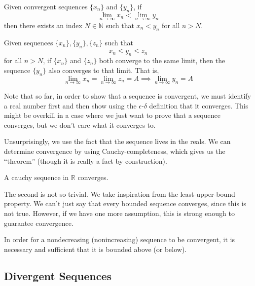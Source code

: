 \documentclass{article}
\begin{document}
    \begin{theorem}
      Given convergent sequences $\{x_n\}$ and $\{y_n\}$, if 
      \[ \lim_{n \rightarrow \infty} x_n < \lim_{n \rightarrow \infty} y_n\]
      then there exists an index $N \in \mathbb{N}$ such that $x_n < y_n$ for all $n > N$. 
    \end{theorem}

    \begin{theorem}
      Given sequences $\{x_n\}, \{y_n\}, \{z_n\}$ such that 
      \[x_n \leq y_n \leq z_n\]
      for all $n > N$, if $\{x_n\}$ and $\{z_n\}$ both converge to the same limit, then the sequence $\{y_n\}$ also converges to that limit. That is, 
      \[\lim_{n \rightarrow \infty} x_n = \lim_{n \rightarrow \infty} z_n = A \implies \lim_{n \rightarrow \infty} y_n = A\]
    \end{theorem} 

    Note that so far, in order to show that a sequence is convergent, we must identify a real number first and then show using the $\epsilon$-$\delta$ definition that it converges. This might be overkill in a case where we just want to prove that a sequence converges, but we don't care what it converges to. 

    Unsurprisingly, we use the fact that the sequence lives in the reals. We can determine convergence by using Cauchy-completeness, which gives us the ``theorem'' (though it is really a fact by construction). 

    \begin{theorem}
      A cauchy sequence in $\mathbb{R}$ converges. 
    \end{theorem} 

    The second is not so trivial. We take inspiration from the least-upper-bound property. We can't just say that every bounded sequence converges, since this is not true. However, if we have one more assumption, this is strong enough to guarantee convergence. 

    \begin{lemma}
      In order for a nondecreasing (nonincreasing) sequence to be convergent, it is necessary and sufficient that it is bounded above (or below). 
    \end{lemma}

  \subsection{Divergent Sequences}
\end{document}
